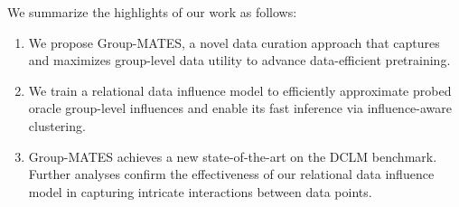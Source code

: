 We summarize the highlights of our work as follows:
\begin{enumerate}
    \item We propose Group-MATES, a novel data curation approach that captures and maximizes group-level data utility to advance data-efficient pretraining.
    \item We train a relational data influence model to efficiently approximate probed oracle group-level influences and enable its fast inference via influence-aware clustering.
    \item Group-MATES achieves a new state-of-the-art on the DCLM benchmark. Further analyses confirm the effectiveness of our relational data influence model in capturing intricate interactions between data points.
\end{enumerate}